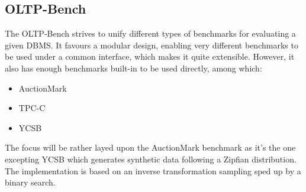 \subsection{OLTP-Bench}
The OLTP-Bench \cite{difallahOLTPBenchExtensibleTestbed2013} strives to unify different types of benchmarks for evaluating a given \ac{DBMS}. It favours a modular design, enabling very different benchmarks
to be used under a common interface, which makes it quite extensible. However, it also has enough benchmarks built-in to be used directly, among which:
\begin{itemize}
  \item AuctionMark \cite{AuctionMarkOLTPBenchmark}
  \item \ac{TPC-C}
  \item \ac{YCSB}
\end{itemize}

The focus will be rather layed upon the AuctionMark benchmark as it's the one excepting \ac{YCSB} which generates synthetic
data following a Zipfian distribution. The implementation is based on an inverse transformation sampling sped up by a binary search.

